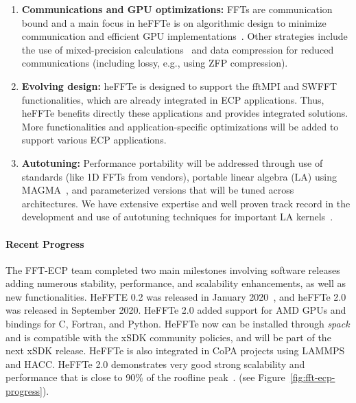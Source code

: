 \begin{enumerate}
\item
\textbf{Communications and GPU optimizations:}
FFTs are communication bound and a main focus in heFFTe is on algorithmic
design to minimize communication and efficient GPU implementations~\cite{sc19,eurompi19}.
Other strategies include the use of mixed-precision calculations~\cite{Haidar2018,tcfft18}
and data compression for reduced communications (including lossy, e.g., using ZFP compression).
\item
\textbf{Evolving design:}
heFFTe is designed to support the fftMPI and SWFFT functionalities,
which are already integrated in ECP applications. Thus, heFFTe benefits
directly these applications and provides integrated solutions. 
More functionalities and application-specific optimizations will be added 
to support various ECP applications. 
\item
\textbf{Autotuning:}
Performance portability will be addressed through use of standards (like 1D FFTs 
from vendors), portable linear algebra (LA) using MAGMA~\cite{Tomov_2010_pcsa}, 
and parameterized versions that will be tuned across architectures. We have extensive 
expertise and well proven track record in the development and use of autotuning techniques 
for important LA kernels~\cite{Nath2010,Kurzak2012gemmfermi}. 
\end{enumerate}

\paragraph{Recent Progress}
The FFT-ECP team completed two main milestones involving software releases adding 
numerous stability, performance, and scalability enhancements, as well as new functionalities. 
HeFFTE 0.2 was released in January 2020~\cite{heffte0.2}, and heFFTe 2.0 was released in September 
2020. HeFFTe 2.0 added support for AMD GPUs and bindings for C, Fortran, and Python.
HeFFTe now can be installed through {\it spack} and is compatible with the xSDK community 
policies, and will be part of the next xSDK release. HeFFTe is also integrated in
CoPA projects using LAMMPS and HACC. HeFFTe 2.0 demonstrates very good strong 
scalability and performance that is close to 90\% of the roofline peak~\cite{heffte-iccs20}. 
(see Figure~\ref{fig:fft-ecp-progress}).


